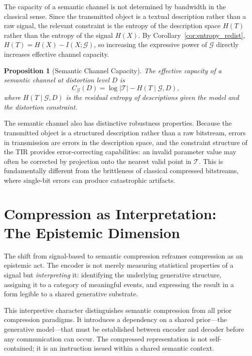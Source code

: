 \documentclass[11pt,a4paper]{article}
\newtheorem{proposition}[theorem]{Proposition}
\theoremstyle{definition}
\theoremstyle{remark}
\begin{document}
The capacity of a semantic channel is not determined by bandwidth in the classical sense. Since the transmitted object is a textual description rather than a raw signal, the relevant constraint is the entropy of the description space $H(T)$ rather than the entropy of the signal $H(X)$. By Corollary~\ref{cor:entropy_redist}, $H(T) = H(X) - I(X;\mathcal{G})$, so increasing the expressive power of $\mathcal{G}$ directly increases effective channel capacity.

\begin{proposition}[Semantic Channel Capacity]
The effective capacity of a semantic channel at distortion level $D$ is
\[
C_{\mathcal{G}}(D) = \log |\mathcal{T}| - H(T \mid \mathcal{G}, D),
\]
where $H(T \mid \mathcal{G}, D)$ is the residual entropy of descriptions given the model and the distortion constraint.
\end{proposition}

The semantic channel also has distinctive robustness properties. Because the transmitted object is a structured description rather than a raw bitstream, errors in transmission are errors in the description space, and the constraint structure of the TIR provides error-correcting capabilities: an invalid parameter value may often be corrected by projection onto the nearest valid point in $\mathcal{T}$. This is fundamentally different from the brittleness of classical compressed bitstreams, where single-bit errors can produce catastrophic artifacts.

\section{Compression as Interpretation: The Epistemic Dimension}
\label{sec:interpretation}

The shift from signal-based to semantic compression reframes compression as an epistemic act. The encoder is not merely measuring statistical properties of a signal but \emph{interpreting} it: identifying the underlying generative structure, assigning it to a category of meaningful events, and expressing the result in a form legible to a shared generative substrate.

This interpretive character distinguishes semantic compression from all prior compression paradigms. It introduces a dependency on a shared prior---the generative model---that must be established between encoder and decoder before any communication can occur. The compressed representation is not self-contained; it is an instruction issued within a shared semantic context.
\end{document}
